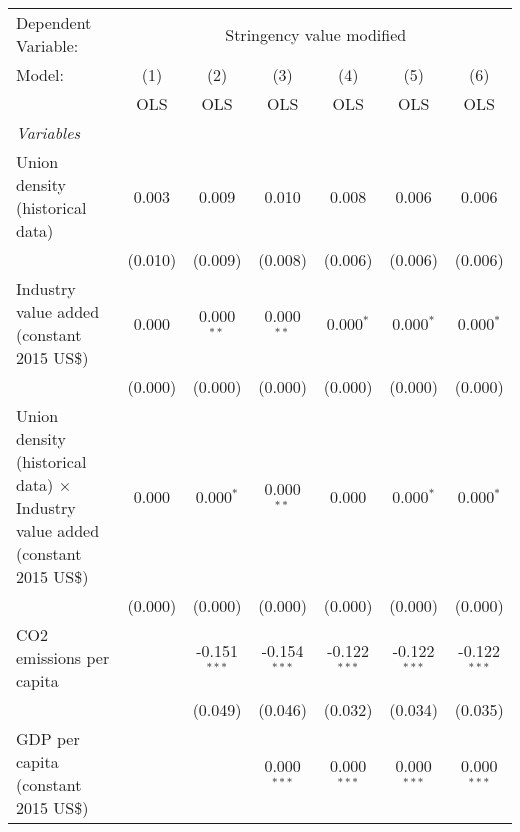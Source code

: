 
\begingroup
\centering
\begin{tabular}{lcccccc}
   \toprule
   Dependent Variable: & \multicolumn{6}{c}{Stringency value modified}\\
   Model:                                                                               & (1)     & (2)            & (3)            & (4)            & (5)            & (6)\\  
                                                                                        &  OLS    & OLS            & OLS            & OLS            & OLS            & OLS\\  
   \midrule
   \emph{Variables}\\
   Union density (historical data)                                                      & 0.003   & 0.009          & 0.010          & 0.008          & 0.006          & 0.006\\   
                                                                                        & (0.010) & (0.009)        & (0.008)        & (0.006)        & (0.006)        & (0.006)\\   
   Industry value added (constant 2015 US\$)                                            & 0.000   & 0.000$^{**}$   & 0.000$^{**}$   & 0.000$^{*}$    & 0.000$^{*}$    & 0.000$^{*}$\\   
                                                                                        & (0.000) & (0.000)        & (0.000)        & (0.000)        & (0.000)        & (0.000)\\   
   Union density (historical data) $\times$ Industry value added (constant 2015 US\$)   & 0.000   & 0.000$^{*}$    & 0.000$^{**}$   & 0.000          & 0.000$^{*}$    & 0.000$^{*}$\\   
                                                                                        & (0.000) & (0.000)        & (0.000)        & (0.000)        & (0.000)        & (0.000)\\   
   CO2 emissions per capita                                                             &         & -0.151$^{***}$ & -0.154$^{***}$ & -0.122$^{***}$ & -0.122$^{***}$ & -0.122$^{***}$\\   
                                                                                        &         & (0.049)        & (0.046)        & (0.032)        & (0.034)        & (0.035)\\   
   GDP per capita (constant 2015 US\$)                                                  &         &                & 0.000$^{***}$  & 0.000$^{***}$  & 0.000$^{***}$  & 0.000$^{***}$\\   

\end{tabular}
